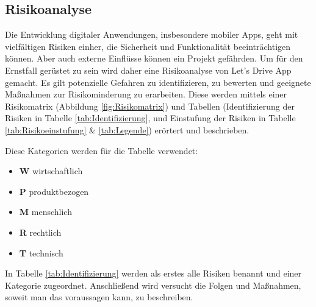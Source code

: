 \subsection{Risikoanalyse}
Die Entwicklung digitaler Anwendungen, insbesondere mobiler Apps, geht mit vielfältigen Risiken einher, die Sicherheit und Funktionalität beeinträchtigen können. Aber auch externe Einflüsse können ein Projekt gefährden. Um für den Ernstfall gerüstet zu sein wird daher eine Risikoanalyse von Let's Drive App gemacht. Es gilt potenzielle Gefahren zu identifizieren, zu bewerten und geeignete Maßnahmen zur Risikominderung zu erarbeiten. Diese werden mittels einer Risikomatrix (Abbildung \ref{fig:Risikomatrix}) und Tabellen (Identifizierung der Risiken in Tabelle \ref{tab:Identifizierung}, und Einstufung der Risiken in Tabelle \ref{tab:Risikoeinstufung} \& \ref{tab:Legende}) erörtert und beschrieben.


\begin{minipage}{\textwidth}
	Diese Kategorien werden für die Tabelle verwendet:
	\begin{itemize}[itemsep=0pt,parsep=0pt]
		\item \textbf{W} wirtschaftlich
		\item \textbf{P} produktbezogen
		\item \textbf{M} menschlich
		\item \textbf{R} rechtlich
		\item \textbf{T} technisch
	\end{itemize}
\end{minipage}

		In Tabelle \ref{tab:Identifizierung} werden als erstes alle Risiken benannt und einer Kategorie zugeordnet. Anschließend wird versucht die Folgen und Maßnahmen, soweit man das voraussagen kann, zu beschreiben.

